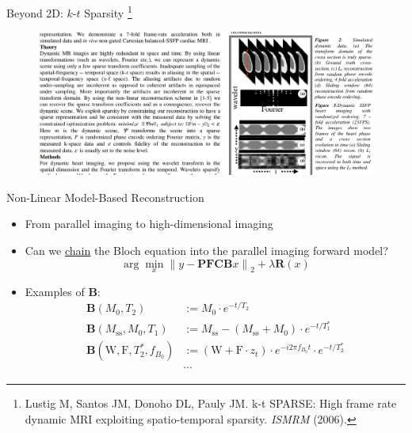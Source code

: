 \documentclass[aspectratio=169]{beamer}
\newcommand*{\norm}[1]{\left\lVert#1\right\rVert}
\newcommand{\argmin}{\arg\!\min}
\begin{document}
	\begin{frame}{Beyond 2D: $k$-$t$ Sparsity \footnote{Lustig M, Santos JM, Donoho DL, Pauly JM. k-t SPARSE: High frame rate dynamic MRI exploiting spatio-temporal sparsity. \textit{ISMRM} (2006).}}
		\begin{figure}
			\centering
			\includegraphics[width=\textwidth]{figures/k-t_sparse.png}
		\end{figure}
	\end{frame}
	
	\begin{frame}{Non-Linear Model-Based Reconstruction}
		\begin{itemize}
			\item <1-> From parallel imaging to high-dimensional imaging
			
			\item <2-> Can we \underline{chain} the Bloch equation into the parallel imaging forward model?
			\begin{equation}
				\argmin_x \norm{y - \mathbf{P} \mathbf{F} \mathbf{C} \mathbf{B} x}_2 + \lambda \mathbf{R}(x)
			\end{equation}
			
			\item <3-> Examples of $\mathbf{B}$:
			\begin{align}
				\mathbf{B}(M_0, T_2) &:= M_0 \cdot e^{-t/T_2} \\
				\mathbf{B}(M_\text{ss}, M_0, T_1) &:= M_\text{ss} - (M_\text{ss} + M_0) \cdot e^{-t/T_1^*} \\
				\mathbf{B}(\text{W}, \text{F}, T_2^*, f_{B_0}) &:= (\text{W} + \text{F} \cdot z_t) \cdot e^{-i2\pi f_{B_0} t} \cdot e^{- t/T_2^*} \\
				& \cdots
			\end{align}
		\end{itemize}
	\end{frame}
	
\end{document}
